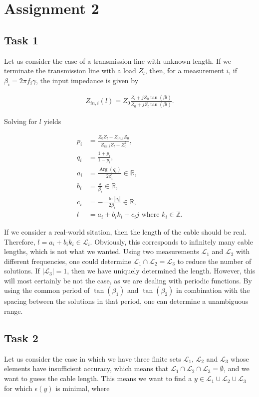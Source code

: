 \documentclass[11pt,titlepage]{report}
\begin{document}
\chapter{Assignment 2}
\section{Task 1}
Let us consider the case of a transmission line with unknown length. If we terminate the transmission line with a load $Z_l$, then, for a measurement $i$, if $\beta_i=2 \pi f_i \gamma$, the input impedance is given by

\begin{align}
	Z_{in,i}(l)=Z_0\frac{Z_l+j Z_0 \tan{(\beta l)}}{Z_0+j Z_l \tan{(\beta l)}}.
\end{align}

Solving for $l$ yields

\begin{align}
	p_i &= \frac{Z_0 Z_l - Z_{in,i} Z_0}{Z_{in,i} Z_l - Z_0^2}, \\
	q_i &= \frac{1+p_i}{1-p_i}, \\
	a_i &= \frac{\operatorname{Arg}(q_i)}{ 2\beta_i} \in \mathbb{R}, \\
	b_i &= \frac{\pi}{\beta_i} \in \mathbb{R}, \\
	c_i &= -\frac{-\operatorname{ln}|q_i|}{2 \beta_i} \in \mathbb{R}, \\
	l &= a_i + b_i k_i + c_i j \text{ where } k_i \in \mathbb{Z}.
\end{align}

If we consider a real-world sitation, then the length of the cable should be real. Therefore, $l=a_i+b_i k_i \in \mathcal{L}_i$. Obviously, this corresponds to infinitely many cable lengths, which is not what we wanted. Using two measurements $\mathcal{L}_1$ and $\mathcal{L}_2$ with different frequencies, one could determine $\mathcal{L}_1 \cap \mathcal{L}_2 = \mathcal{L}_3$ to reduce the number of solutions. If $|\mathcal{L}_3|=1$, then we have uniquely determined the length. However, this will most certainly be not the case, as we are dealing with periodic functions. By using the common period of $\tan{(\beta_1)}$ and $\tan{(\beta_2)}$ in combination with the spacing between the solutions in that period, one can determine a unambiguous range.


\section{Task 2}
Let us consider the case in which we have three finite sets $\mathcal{L}_1$, $\mathcal{L}_2$ and $\mathcal{L}_3$ whose elements have insufficient accuracy, which means that $\mathcal{L}_1 \cap \mathcal{L}_2 \cap \mathcal{L}_3 = \emptyset$, and we want to guess the cable length. This means we want to find a $y \in \mathcal{L}_1 \cup \mathcal{L}_2 \cup \mathcal{L}_3$ for which $\epsilon(y)$ is minimal, where
\end{document}
